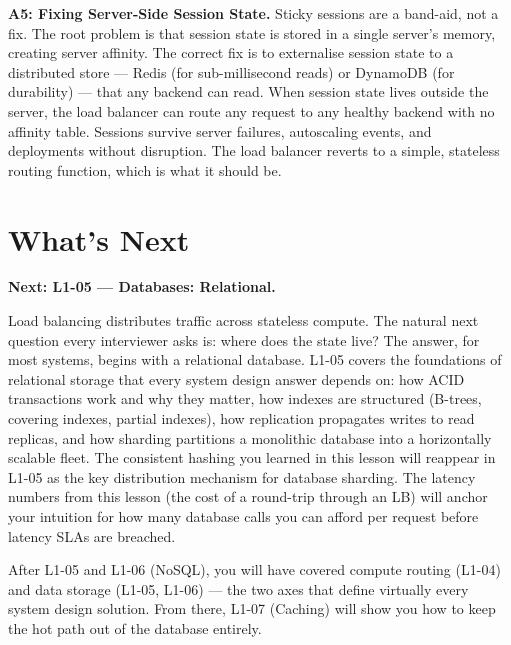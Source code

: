 \documentclass[11pt,a4paper]{article}
\begin{document}
\begin{answerbox}
  \medskip
  \textbf{A5: Fixing Server-Side Session State.}
  Sticky sessions are a band-aid, not a fix. The root problem is that session state is stored in a
  single server's memory, creating server affinity. The correct fix is to externalise session state
  to a distributed store --- Redis (for sub-millisecond reads) or DynamoDB (for durability) ---
  that any backend can read. When session state lives outside the server, the load balancer can
  route any request to any healthy backend with no affinity table. Sessions survive server failures,
  autoscaling events, and deployments without disruption. The load balancer reverts to a simple,
  stateless routing function, which is what it should be.

\end{answerbox}

\newpage
\section{What's Next}

\begin{insightbox}
  \textbf{Next: L1-05 --- Databases: Relational.}

  Load balancing distributes traffic across stateless compute. The natural next question every
  interviewer asks is: where does the state live? The answer, for most systems, begins with a
  relational database. L1-05 covers the foundations of relational storage that every system design
  answer depends on: how ACID transactions work and why they matter, how indexes are structured
  (B-trees, covering indexes, partial indexes), how replication propagates writes to read replicas,
  and how sharding partitions a monolithic database into a horizontally scalable fleet. The
  consistent hashing you learned in this lesson will reappear in L1-05 as the key distribution
  mechanism for database sharding. The latency numbers from this lesson (the cost of a round-trip
  through an LB) will anchor your intuition for how many database calls you can afford per request
  before latency SLAs are breached.

  After L1-05 and L1-06 (NoSQL), you will have covered compute routing (L1-04) and data storage
  (L1-05, L1-06) --- the two axes that define virtually every system design solution. From there,
  L1-07 (Caching) will show you how to keep the hot path out of the database entirely.
\end{insightbox}
\end{document}
